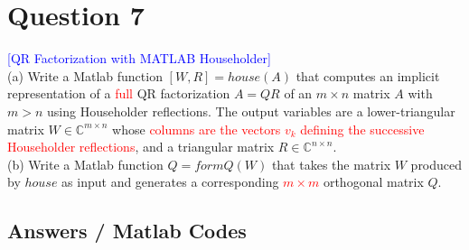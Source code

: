 \section*{Question 7}
\textcolor{blue}{[QR Factorization with MATLAB Householder]} 
\\
(a) Write a Matlab function $[W,R] = house(A)$ that computes an implicit representation 
of a \textcolor{red}{full} QR factorization 
$A = QR$ of an $m \times n$ matrix $A$ with $m > n$ using Householder reflections. 
The output variables are a lower-triangular matrix $W \in \mathbb{C}^{m \times n}$ 
whose \textcolor{red}{columns are the vectors $v_k$ defining the successive Householder reflections}, 
and a triangular matrix $R \in \mathbb{C}^{n \times n}$.
\\
(b) Write a Matlab function $Q = formQ(W)$ that takes 
the matrix $W$ produced by $house$ as input 
and generates a corresponding \textcolor{red}{$m \times m$} orthogonal matrix $Q$.

\subsection*{Answers / Matlab Codes}












